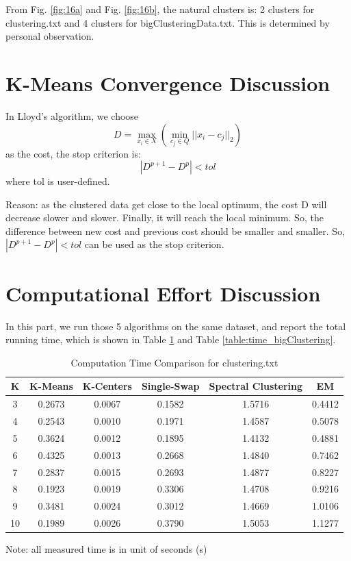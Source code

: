 From Fig. \ref{fig:16a} and Fig. \ref{fig:16b}, the natural clusters is: 2 clusters for clustering.txt and 4 clusters for bigClusteringData.txt. This is determined by personal observation. \\

\section{\Large K-Means Convergence Discussion}

In Lloyd's algorithm, we choose 
    $$D = \underset{x_i \in X}{\max}( \underset{c_j \in Q}{\min}{||x_i - c_j||_2})$$
as the cost, the stop criterion is: 
    $$|D^{p+1} - D^{p}| < tol$$
where tol is user-defined.

Reason: as the clustered data get close to the local optimum, the cost D will decrease slower and slower. Finally, it will reach the local minimum. So, the difference between new cost and previous cost should be smaller and smaller. So, $|D^{p+1} - D^{p}| < tol$ can be used as the stop criterion.\\

\section{\Large Computational Effort Discussion}

In this part, we run those 5 algorithms on the same dataset, and report the total running time, which is shown in Table \ref{table:time_clustering} and Table \ref{table:time_bigClustering}.

\begin{table}[H]
	\centering
	\caption{Computation Time Comparison for clustering.txt}
	\label{table:time_clustering}	
	\begin{tabular}{ c | c | c | c | c | c }
		\hline \hline
		K  	&	K-Means    & K-Centers    & Single-Swap    & Spectral Clustering    & EM \\[0.1cm]
		\hline
		3	   &	0.2673     & 0.0067   & 0.1582    & 1.5716    & 0.4412 \\[0.1cm]
		4    &	0.2543     & 0.0010   & 0.1971    & 1.4587    & 0.5078 \\[0.1cm]
		5    &	0.3624     & 0.0012   & 0.1895    & 1.4132    & 0.4881 \\[0.1cm]
		6    &	0.4325     & 0.0013   & 0.2668    & 1.4840    & 0.7462 \\[0.1cm]
		7    &	0.2837     & 0.0015   & 0.2693    & 1.4877    & 0.8227 \\[0.1cm]
		8    &	0.1923     & 0.0019   & 0.3306    & 1.4708    & 0.9216 \\[0.1cm]
		9    &	0.3481     & 0.0024   & 0.3012    & 1.4669    & 1.0106 \\[0.1cm]
		10  &	0.1989     & 0.0026   & 0.3790    & 1.5053    & 1.1277 \\[0.1cm]
		\hline	
	\end{tabular}
\end{table}
{\centering Note: all measured time is in unit of seconds (s)}

